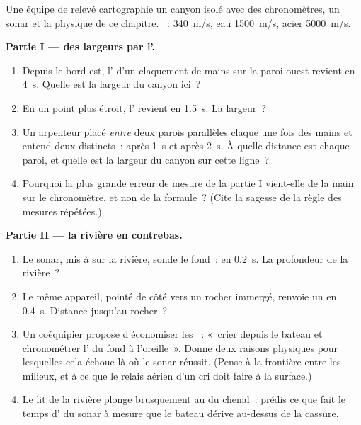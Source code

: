 \begin{problem}\label{pb:g7:sound-production:1}
Une équipe de relevé cartographie un canyon isolé avec des
chronomètres, un sonar et la physique de ce chapitre. ~: 
\qty{340}{m/s}, eau \qty{1500}{m/s}, acier \qty{5000}{m/s}.

\medskip\noindent\textbf{Partie I --- des largeurs par l'.}
\begin{enumerate}
  \item Depuis le bord est, l' d'un claquement de mains sur la
        paroi ouest revient en \qty{4}{s}. Quelle est la largeur du
        canyon ici~?
  \item En un point plus étroit, l' revient en \qty{1.5}{s}. La
        largeur~?
  \item Un arpenteur placé \emph{entre} deux parois parallèles
        claque une fois des mains et entend deux  distincts~:
        après \qty{1}{s} et après \qty{2}{s}. À quelle distance est
        chaque paroi, et quelle est la largeur du canyon sur cette
        ligne~?
  \item Pourquoi la plus grande erreur de mesure de la partie I
        vient-elle de la main sur le chronomètre, et non de la
        formule~? (Cite la sagesse de la règle des mesures
        répétées.)
\end{enumerate}

\medskip\noindent\textbf{Partie II --- la rivière en contrebas.}
\begin{enumerate}[resume]
  \item Le sonar, mis à  sur la rivière, sonde le fond~:
         en \qty{0.2}{s}. La profondeur de la rivière~?
  \item Le même appareil, pointé de côté vers un rocher immergé,
        renvoie un  en \qty{0.4}{s}. Distance jusqu'au rocher~?
  \item Un coéquipier propose d'économiser les ~: «~crier
        depuis le bateau et chronométrer l' du fond à
        l'oreille~». Donne deux raisons physiques pour lesquelles
        cela échoue là où le sonar réussit. (Pense à la frontière
        entre les milieux, et à ce que le relais aérien d'un cri
        doit faire à la surface.)
  \item Le lit de la rivière plonge brusquement au  du
        chenal~: prédis ce que fait le temps d' du sonar à
        mesure que le bateau dérive au-dessus de la cassure.
\end{enumerate}


\end{problem}
